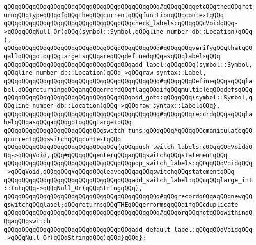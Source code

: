 \verb|qQQqqQQqqQQqqQQqqQQqqQQqqQQqqQQqqQQqqQQqqQQq#qQQqqQQqgetqQQqtheqQQqreturnqQQqtypeqQQqofqQQqtheqQQqcurrentqQQqfunctionqQQqcontextqQQq|\newline
\verb|qQQqqQQqqQQqqQQqqQQqqQQqqQQqqQQqqQQqcheck_labels:qQQqqQQqVoidqQQq->qQQqqQQqNull_Or(qQQq(symbol::Symbol,qQQqline_number_db::Location)qQQq),|\newline
\verb|qQQqqQQqqQQqqQQqqQQqqQQqqQQqqQQqqQQqqQQqqQQq#qQQqqQQqverifyqQQqthatqQQqallqQQqgotoqQQqtargetsqQQqareqQQqdefinedqQQqasqQQqlabelsqQQq|\newline
\verb|qQQqqQQqqQQqqQQqqQQqqQQqqQQqqQQqqQQqadd_label:qQQqqQQq(symbol::Symbol,qQQqline_number_db::Location)qQQq->qQQqraw_syntax::Label,|\newline
\verb|qQQqqQQqqQQqqQQqqQQqqQQqqQQqqQQqqQQqqQQqqQQq#qQQqqQQqDefineqQQqaqQQqlabel,qQQqreturningqQQqanqQQqerrorqQQqflagqQQqifqQQqmultipleqQQqdefsqQQq|\newline
\verb|qQQqqQQqqQQqqQQqqQQqqQQqqQQqqQQqqQQqadd_goto:qQQqqQQq(symbol::Symbol,qQQqline_number_db::Location)qQQq->qQQqraw_syntax::LabelqQQq},|\newline
\verb|qQQqqQQqqQQqqQQqqQQqqQQqqQQqqQQqqQQqqQQqqQQq#qQQqqQQqrecordqQQqaqQQqlabelqQQqasqQQqaqQQqgotoqQQqtargetqQQq|\newline
\newline
\verb|qQQqqQQqqQQqqQQqqQQqqQQqqQQqswitch_funs:qQQqqQQq#qQQqqQQqmanipulateqQQqcurrentqQQqswitchqQQqcontextqQQq|\newline
\verb|qQQqqQQqqQQqqQQqqQQqqQQqqQQqqQQq{qQQqpush_switch_labels:qQQqqQQqVoidqQQq->qQQqVoid,qQQq#qQQqqQQqenterqQQqaqQQqswitchqQQqstatementqQQq|\newline
\verb|qQQqqQQqqQQqqQQqqQQqqQQqqQQqqQQqqQQqpop_switch_labels:qQQqqQQqVoidqQQq->qQQqVoid,qQQqqQQq#qQQqqQQqleaveqQQqaqQQqswitchqQQqstatementqQQq|\newline
\newline
\verb|qQQqqQQqqQQqqQQqqQQqqQQqqQQqqQQqqQQqadd_switch_label:qQQqqQQqlarge_int::IntqQQq->qQQqNull_Or(qQQqStringqQQq),|\newline
\verb|qQQqqQQqqQQqqQQqqQQqqQQqqQQqqQQqqQQqqQQqqQQq#qQQqrecordqQQqaqQQqnewqQQqswitchqQQqlabel;qQQqreturnsqQQqTHEqQQqerrormsgqQQqifqQQqduplicate|\newline
\verb|qQQqqQQqqQQqqQQqqQQqqQQqqQQqqQQqqQQqqQQqqQQq#qQQqorqQQqnotqQQqwithinqQQqaqQQqswitch|\newline
\newline
\verb|qQQqqQQqqQQqqQQqqQQqqQQqqQQqqQQqqQQqadd_default_label:qQQqqQQqVoidqQQq->qQQqNull_Or(qQQqStringqQQq)qQQq}qQQq};|\newline
